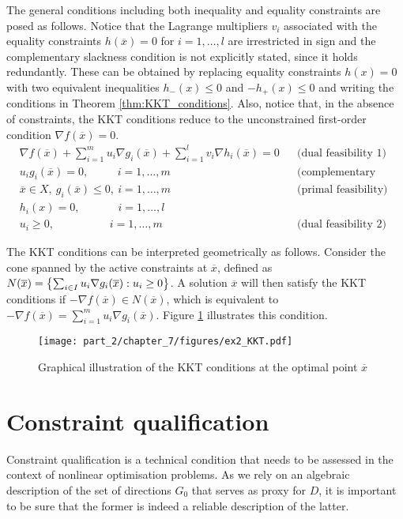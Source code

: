 The general conditions including both inequality and equality constraints are posed as follows. Notice that the Lagrange multipliers $v_i$ associated with the equality constraints $h(\overline{x}) = 0$ for $i=1, \dots,l$ are irrestricted in sign and the complementary slackness condition is not explicitly stated, since it holds redundantly. These can be obtained by replacing equality constraints $h(x) = 0$ with two equivalent inequalities $h_-(x) \leq 0$ and $-h_+(x) \leq 0$ and writing the conditions in Theorem \ref{thm:KKT_conditions}. Also, notice that, in the absence of constraints, the KKT conditions reduce to the unconstrained first-order condition $\nabla f(\overline{x}) = 0$. 
%
\begin{align*}
&\nabla f(\overline{x}) + \sum_{i=1}^m u_i \nabla g_i(\overline{x}) + \sum_{i=1}^{l} v_i \nabla h_i(\overline{x})= 0  &&\text{(dual feasibility 1)}\\ 
&u_i g_i(\overline{x}) = 0, \qquad~~\, i = 1,\dots,m &&\text{(complementary slackness)}\\
&\overline{x} \in X, \ g_i(\overline{x}) \leq 0, \ i = 1,\dots, m   &&\text{(primal feasibility)}\\
&h_i(x) = 0, \qquad\quad~~ i = 1,\dots, l\\
&u_i \geq 0, \qquad\qquad\quad i = 1, \dots, m &&\text{(dual feasibility 2)}
\end{align*}

The KKT conditions can be interpreted geometrically as follows. Consider the cone spanned by the active constraints at $\overline{x}$, defined as $N(\overline{x}) = \left\{ \sum_{i \in I}u_i \nabla g_i(\overline{x}) : u_i \geq 0 \right \}$. A solution $\overline{x}$ will then satisfy the KKT conditions if $-\nabla f(\overline{x}) \in N(\overline{x})$, which is equivalent to $- \nabla f(\overline{x}) = \sum_{i=1}^m u_i \nabla g_i(\overline{x})$. Figure \ref{ex1_cone} illustrates this condition.

\begin{figure}
	\texttt{[image: part\_2/chapter\_7/figures/ex2\_KKT.pdf]}	
	\caption{Graphical illustration of the KKT conditions at the optimal point $\overline{x}$}\label{ex1_cone} 
\end{figure} 


\section{Constraint qualification}


Constraint qualification is a technical condition that needs to be assessed in the context of nonlinear optimisation problems. As we rely on an algebraic description of the set of directions $G_0$ that serves as proxy for $D$, it is important to be sure that the former is indeed a reliable description of the latter. 


